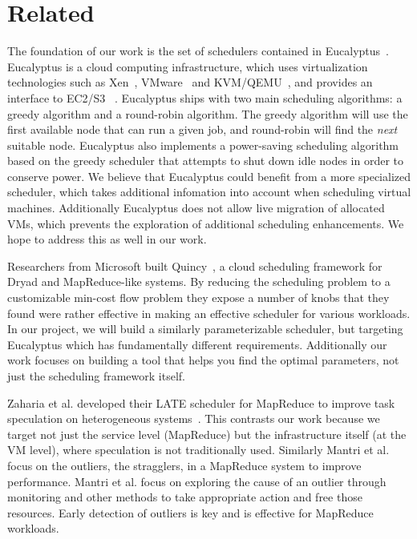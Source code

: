 \section{Related}



The foundation of our work is the set of schedulers contained in
Eucalyptus~\cite{Eucalyptus}.  Eucalyptus is a cloud computing infrastructure,
which uses virtualization technologies such as Xen~\cite{Xen},
VMware~\cite{VMware} and KVM/QEMU~\cite{QEMU}, and provides an interface to
EC2/S3 ~\cite{EC2,S3}.   Eucalyptus ships with two main scheduling algorithms: a
greedy algorithm and a round-robin algorithm.  The greedy algorithm will use the
first available node that can run a given job, and round-robin will
find the \emph{next} suitable node.
Eucalyptus also implements a power-saving scheduling algorithm based on the greedy scheduler that
attempts to shut down idle nodes  in order to conserve power.  We believe that
Eucalyptus could benefit from a more specialized scheduler, which takes
additional infomation into account when scheduling virtual machines.
Additionally Eucalyptus does not allow live migration of allocated VMs, which
prevents the exploration of additional scheduling enhancements.  We hope to
address this as well in our work.

Researchers from Microsoft built Quincy~\cite{Quincy}, a cloud
scheduling framework for Dryad and MapReduce-like systems.  By reducing the
scheduling problem to a customizable min-cost flow problem they expose a number
of knobs that they found were rather effective in making an effective scheduler
for various workloads.  In our project, we will build a similarly
parameterizable scheduler, but targeting Eucalyptus which has fundamentally
different requirements.  Additionally our work focuses on building a tool that
helps you find the optimal parameters, not just the scheduling framework itself.

Zaharia et al. developed their LATE scheduler for MapReduce to improve task
speculation on heterogeneous systems~\cite{Zaharia}.  This contrasts our work
because we target not just the service level (MapReduce) but the infrastructure
itself (at the VM level), where speculation is not traditionally used.
Similarly Mantri et al.~\cite{Mantri} focus on the outliers, the stragglers, in
a MapReduce system to improve performance.  Mantri et al. focus on exploring the
cause of an outlier through monitoring and other methods to take appropriate
action and free those resources.  Early detection of outliers is key and is
effective for MapReduce workloads.

